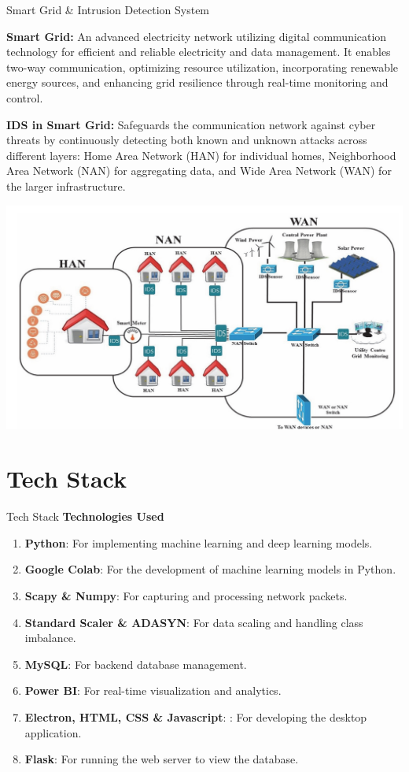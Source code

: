 \documentclass{beamer}
\begin{document}
\begin{frame}{Smart Grid \& Intrusion Detection System}
\begin{minipage}{0.6\textwidth}
\textbf{Smart Grid:} An advanced electricity network utilizing digital communication technology for efficient and reliable electricity and data management. It enables two-way communication, optimizing resource utilization, incorporating renewable energy sources, and enhancing grid resilience through real-time monitoring and control.
\par \textbf{IDS in Smart Grid:} Safeguards the communication network against cyber threats by continuously detecting both known and unknown attacks across different layers: Home Area Network (HAN) for individual homes, Neighborhood Area Network (NAN) for aggregating data, and Wide Area Network (WAN) for the larger infrastructure.
\end{minipage}%
\begin{minipage}{0.4\textwidth}
\includegraphics[width=\textwidth]{images/arch.png}
\end{minipage}
\end{frame}

\section{Tech Stack}

\begin{frame}{Tech Stack}
\textbf{Technologies Used}
\begin{enumerate}
    \item \textbf{Python}: For implementing machine learning and deep learning models.
    \item \textbf{Google Colab}: For the development of machine learning models in Python.
    \item \textbf{Scapy \& Numpy}: For capturing and processing network packets.
    \item \textbf{Standard Scaler \& ADASYN}: For data scaling and handling class imbalance.
    \item \textbf{MySQL}: For backend database management.
    \item \textbf{Power BI}: For real-time visualization and analytics.
    \item \textbf{Electron, HTML, CSS \& Javascript}: : For developing the desktop application.
    \item \textbf{Flask}: For running the web server to view the database.
\end{enumerate}
\end{frame}
\end{document}
